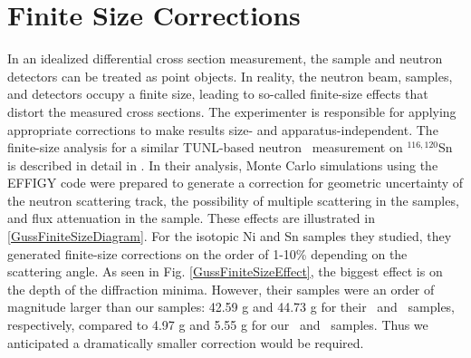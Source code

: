\section{Finite Size Corrections}
In an idealized differential cross section measurement, the sample and neutron
detectors can be treated as point objects. In reality, the neutron beam,
samples, and detectors occupy a finite size, leading to so-called finite-size
effects that distort the measured cross sections. The experimenter is responsible
for applying appropriate corrections to make results size- and
apparatus-independent. The finite-size analysis for
a similar TUNL-based neutron \el\ measurement on $^{116,120}$Sn is described in detail
in \cite{GussPhDThesis}. In their analysis, Monte Carlo simulations using the
EFFIGY code were
prepared to generate a correction for geometric uncertainty of the neutron
scattering track, the possibility of multiple scattering
in the samples, and flux attenuation in the sample. These effects are illustrated in
\ref{GussFiniteSizeDiagram}.
For the isotopic Ni and Sn samples they studied, they generated finite-size
corrections on the order of 1-10\% depending on the scattering angle. As seen in
Fig. \ref{GussFiniteSizeEffect}, the
biggest effect is on the depth of the diffraction minima.
However, their samples
were an order of magnitude larger than our
samples: 42.59 g and 44.73 g for their \snSixteen\ and \snTwenty\ samples,
respectively, compared to 4.97 g and 5.55 g for our \snTwelve\ and \snFour\
samples. Thus we anticipated a dramatically smaller correction would be
required.

